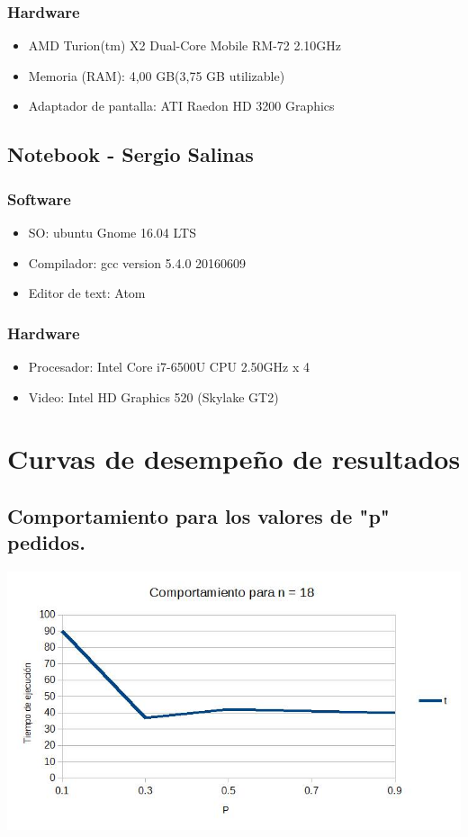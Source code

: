 \documentclass[12pt,letterpaper]{scrartcl}
\begin{document}
\subsubsection{Hardware}
\begin{itemize}
\item AMD Turion(tm) X2 Dual-Core Mobile RM-72 2.10GHz
\item Memoria (RAM): 4,00 GB(3,75 GB utilizable)
\item Adaptador de pantalla: ATI Raedon HD 3200 Graphics
\end{itemize}



\subsection{Notebook - Sergio Salinas}
\subsubsection{Software}
\begin{itemize}
\item  SO: ubuntu Gnome 16.04 LTS
\item Compilador: gcc version 5.4.0 20160609 
\item Editor de text: Atom
\end{itemize}

\subsubsection{Hardware}
\begin{itemize}
\item Procesador: Intel Core i7-6500U CPU  2.50GHz x 4 
\item Video: Intel HD Graphics 520 (Skylake GT2) 
\end{itemize}


\newpage

\section{Curvas de desempeño de resultados}
\subsection{Comportamiento para los valores de "p" pedidos.}

\includegraphics[scale=0.55]{n}
\end{document}
